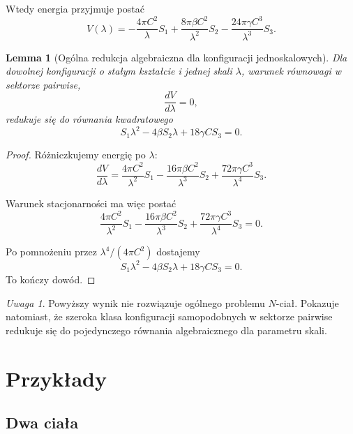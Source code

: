 \documentclass[11pt,a4paper]{article}
\theoremstyle{plain}
\newtheorem{lemma}{Lemma}
\theoremstyle{remark}
\newtheorem*{remark}{Uwaga}
\begin{document}
Wtedy energia przyjmuje postać
\begin{equation}
V(\lambda) = -\frac{4\pi C^2}{\lambda}S_1
+ \frac{8\pi\beta C^2}{\lambda^2}S_2
- \frac{24\pi\gamma C^3}{\lambda^3}S_3.
\end{equation}

\begin{lemma}[Ogólna redukcja algebraiczna dla konfiguracji jednoskalowych]
Dla dowolnej konfiguracji o stałym kształcie i jednej skali $\lambda$, warunek równowagi w sektorze pairwise,
\begin{equation}
\frac{dV}{d\lambda}=0,
\end{equation}
redukuje się do równania kwadratowego
\begin{equation}
\boxed{S_1\lambda^2 - 4\beta S_2\lambda + 18\gamma C S_3 = 0.}
\end{equation}
\end{lemma}

\begin{proof}
Różniczkujemy energię po $\lambda$:
\begin{equation}
\frac{dV}{d\lambda}
= \frac{4\pi C^2}{\lambda^2}S_1
- \frac{16\pi\beta C^2}{\lambda^3}S_2
+ \frac{72\pi\gamma C^3}{\lambda^4}S_3.
\end{equation}

Warunek stacjonarności ma więc postać
\begin{equation}
\frac{4\pi C^2}{\lambda^2}S_1
- \frac{16\pi\beta C^2}{\lambda^3}S_2
+ \frac{72\pi\gamma C^3}{\lambda^4}S_3 = 0.
\end{equation}

Po pomnożeniu przez $\lambda^4/(4\pi C^2)$ dostajemy
\begin{equation}
S_1\lambda^2 - 4\beta S_2\lambda + 18\gamma C S_3 = 0.
\end{equation}
To kończy dowód.
\end{proof}

\begin{remark}
Powyższy wynik nie rozwiązuje ogólnego problemu $N$-ciał. Pokazuje natomiast, że szeroka klasa konfiguracji samopodobnych w sektorze pairwise redukuje się do pojedynczego równania algebraicznego dla parametru skali.
\end{remark}

\section{Przykłady}

\subsection{Dwa ciała}
\end{document}
